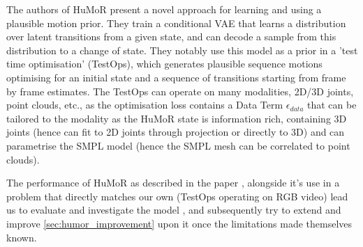 The authors of HuMoR \cite{humor} present a novel approach for learning and using a plausible motion prior. They train a conditional VAE that learns a distribution over latent transitions from a given state, and can decode a sample from this distribution to a change of state. They notably use this model as a prior in a 'test time optimisation' (TestOps), which generates plausible sequence motions optimising for an initial state and a sequence of transitions starting from frame by frame estimates. The TestOps can operate on many modalities, 2D/3D joints, point clouds, etc., as the optimisation loss contains a Data Term $\epsilon_{data}$ that can be tailored to the modality as the HuMoR state is information rich, containing 3D joints (hence can fit to 2D joints through projection or directly to 3D) and can parametrise the SMPL model (hence the SMPL mesh can be correlated to point clouds). 

The performance of HuMoR as described in the paper \cite{humor}, alongside it's use in a problem that directly matches our own (TestOps operating on RGB video) lead us to evaluate and investigate the model , and subsequently try to extend and improve \ref{sec:humor_improvement} upon it once the limitations made themselves known.


